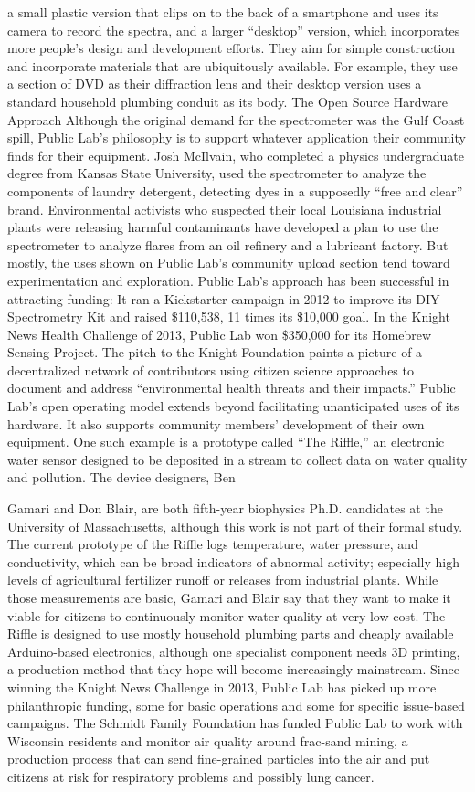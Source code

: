 a small plastic version that clips on to the back of a smartphone and uses its
camera to record the spectra, and a larger ``desktop'' version, which incorporates
more people's design and development efforts. They aim for simple
construction and incorporate materials that are ubiquitously available. For
example, they use a section of DVD as their diffraction lens and their desktop
version uses a standard household plumbing conduit as its body.
The Open Source Hardware Approach
Although the original demand for the spectrometer was the Gulf Coast
spill, Public Lab's philosophy is to support whatever application their community
finds for their equipment. Josh McIlvain, who completed a physics
undergraduate degree from Kansas State University, used the spectrometer
to analyze the components of laundry detergent, detecting dyes in a
supposedly ``free and clear'' brand. Environmental activists who suspected
their local Louisiana industrial plants were releasing harmful contaminants
have developed a plan to use the spectrometer to analyze flares from an oil
refinery and a lubricant factory. But mostly, the uses shown on Public Lab's
community upload section tend toward experimentation and exploration.
Public Lab's approach has been successful in attracting funding: It ran a
Kickstarter campaign in 2012 to improve its DIY Spectrometry Kit and
raised \$110,538, 11 times its \$10,000 goal. In the Knight News Health Challenge
of 2013, Public Lab won \$350,000 for its Homebrew Sensing Project.
The pitch to the Knight Foundation paints a picture of a decentralized
network of contributors using citizen science approaches to document and
address ``environmental health threats and their impacts.''
Public Lab's open operating model extends beyond facilitating unanticipated
uses of its hardware. It also supports community members' development
of their own equipment. One such example is a prototype called
``The Riffle,'' an electronic water sensor designed to be deposited in a stream
to collect data on water quality and pollution. The device designers, Ben

Gamari and Don Blair, are both fifth-year biophysics Ph.D. candidates at the
University of Massachusetts, although this work is not part of their formal
study. The current prototype of the Riffle logs temperature, water pressure,
and conductivity, which can be broad indicators of abnormal activity; especially
high levels of agricultural fertilizer runoff or releases from industrial
plants. While those measurements are basic, Gamari and Blair say that they
want to make it viable for citizens to continuously monitor water quality
at very low cost. The Riffle is designed to use mostly household plumbing
parts and cheaply available Arduino-based electronics, although one specialist
component needs 3D printing, a production method that they hope
will become increasingly mainstream.
Since winning the Knight News Challenge in 2013, Public Lab has picked up
more philanthropic funding, some for basic operations and some for specific
issue-based campaigns. The Schmidt Family Foundation has funded
Public Lab to work with Wisconsin residents and monitor air quality around
frac-sand mining, a production process that can send fine-grained particles
into the air and put citizens at risk for respiratory problems and possibly
lung cancer.

